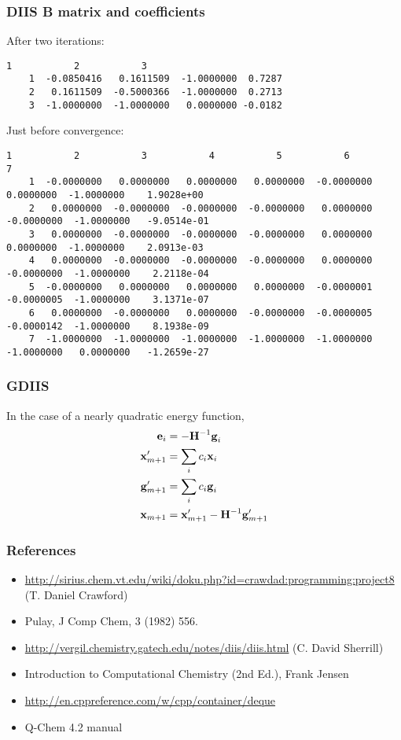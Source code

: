 \documentclass[10pt,compress,red]{beamer}
\begin{document}
\begin{frame}[fragile]
  \frametitle{DIIS B matrix and coefficients}
After two iterations:
\begin{Verbatim}[fontsize=\tiny]
                1           2           3
    1  -0.0850416   0.1611509  -1.0000000  0.7287
    2   0.1611509  -0.5000366  -1.0000000  0.2713
    3  -1.0000000  -1.0000000   0.0000000 -0.0182
\end{Verbatim}
Just before convergence:
\begin{Verbatim}[fontsize=\tiny]
                1           2           3           4           5           6           7
    1  -0.0000000   0.0000000   0.0000000   0.0000000  -0.0000000   0.0000000  -1.0000000    1.9028e+00
    2   0.0000000  -0.0000000  -0.0000000  -0.0000000   0.0000000  -0.0000000  -1.0000000   -9.0514e-01
    3   0.0000000  -0.0000000  -0.0000000  -0.0000000   0.0000000   0.0000000  -1.0000000    2.0913e-03
    4   0.0000000  -0.0000000  -0.0000000  -0.0000000   0.0000000  -0.0000000  -1.0000000    2.2118e-04
    5  -0.0000000   0.0000000   0.0000000   0.0000000  -0.0000001  -0.0000005  -1.0000000    3.1371e-07
    6   0.0000000  -0.0000000   0.0000000  -0.0000000  -0.0000005  -0.0000142  -1.0000000    8.1938e-09
    7  -1.0000000  -1.0000000  -1.0000000  -1.0000000  -1.0000000  -1.0000000   0.0000000   -1.2659e-27
\end{Verbatim}
\end{frame}

\begin{frame}
  \frametitle{GDIIS}
  In the case of a nearly quadratic energy function,
  \begin{align}
    \boldsymbol{\mathbf{e}}_{i} &= -\boldsymbol{\mathbf{H}}^{-1} \boldsymbol{\mathbf{g}}_{i} \\
    \boldsymbol{\mathbf{x}}_{m+1}^{\prime} &= \sum_{i} c_{i} \boldsymbol{\mathbf{x}}_{i} \\
    \boldsymbol{\mathbf{g}}_{m+1}^{\prime} &= \sum_{i} c_{i} \boldsymbol{\mathbf{g}}_{i} \\
    \boldsymbol{\mathbf{x}}_{m+1} &= \boldsymbol{\mathbf{x}}_{m+1}^{\prime} - \boldsymbol{\mathbf{H}}^{-1} \boldsymbol{\mathbf{g}}_{m+1}^{\prime}
  \end{align}
\end{frame}

\begin{frame}
  \frametitle{References}
  \begin{itemize}
  \item
    \url{http://sirius.chem.vt.edu/wiki/doku.php?id=crawdad:programming:project8}
    (T. Daniel Crawford)
  \item Pulay, J Comp Chem, 3 (1982) 556.
  \item \url{http://vergil.chemistry.gatech.edu/notes/diis/diis.html}
    (C. David Sherrill)
  \item Introduction to Computational Chemistry (2nd Ed.), Frank Jensen
  \item \url{http://en.cppreference.com/w/cpp/container/deque}
  \item Q-Chem 4.2 manual
  \end{itemize}
\end{frame}
\end{document}
